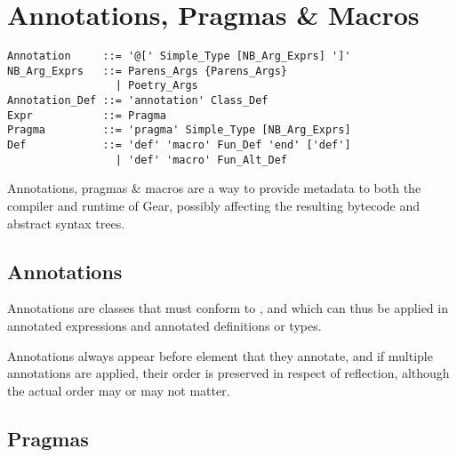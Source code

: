 
\chapter{Annotations, Pragmas \& Macros}
\label{sec:annotations}
\label{sec:pragmas}
\label{sec:macros}


\syntax\begin{lstlisting}
Annotation     ::= '@[' Simple_Type [NB_Arg_Exprs] ']'
NB_Arg_Exprs   ::= Parens_Args {Parens_Args}
                 | Poetry_Args
Annotation_Def ::= 'annotation' Class_Def
Expr           ::= Pragma
Pragma         ::= 'pragma' Simple_Type [NB_Arg_Exprs]
Def            ::= 'def' 'macro' Fun_Def 'end' ['def']
                 | 'def' 'macro' Fun_Alt_Def
\end{lstlisting}

Annotations, pragmas \& macros are a way to provide metadata to both the compiler and runtime of Gear, possibly affecting the resulting bytecode and abstract syntax trees. 





\section{Annotations}

Annotations are classes that must conform to , and which can thus be applied in annotated expressions and annotated definitions or types. 

Annotations always appear before element that they annotate, and if multiple annotations are applied, their order is preserved in respect of reflection, although the actual order may or may not matter. 






\section{Pragmas}
\label{sec:pragmas}

